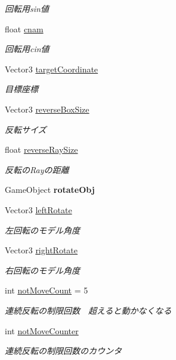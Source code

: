 \begin{DoxyCompactItemize}
\begin{DoxyCompactList}\small\item\em 回転用sin値 \end{DoxyCompactList}\item 
float \hyperlink{class_bone_a2b66e86799188e2d7f0e17aafe966df3}{cnam}
\begin{DoxyCompactList}\small\item\em 回転用cin値 \end{DoxyCompactList}\item 
Vector3 \hyperlink{class_bone_a2fcc3eb5e79c0b3abcffb50e9a60cb33}{target\+Coordinate}
\begin{DoxyCompactList}\small\item\em 目標座標 \end{DoxyCompactList}\item 
Vector3 \hyperlink{class_bone_a7a244045aac150bb4e59bdfe7304c333}{reverse\+Box\+Size}
\begin{DoxyCompactList}\small\item\em 反転サイズ \end{DoxyCompactList}\item 
float \hyperlink{class_bone_a28cb81944e3d4102e78038df1fda96c4}{reverse\+Ray\+Size}
\begin{DoxyCompactList}\small\item\em 反転の\+Rayの距離 \end{DoxyCompactList}\item 
\mbox{\label{class_bone_a8f40ec6b18b86e98c8aa28b661c10b40}} 
Game\+Object {\bfseries rotate\+Obj}
\item 
Vector3 \hyperlink{class_bone_a13ede7fb2b1628b62fb24c247cb2f80c}{left\+Rotate}
\begin{DoxyCompactList}\small\item\em 左回転のモデル角度 \end{DoxyCompactList}\item 
Vector3 \hyperlink{class_bone_ab2ba8ba25c37da3bf2c7a9a3046f137b}{right\+Rotate}
\begin{DoxyCompactList}\small\item\em 右回転のモデル角度 \end{DoxyCompactList}\item 
int \hyperlink{class_bone_ab73dc87056447cb775d87e83c0664395}{not\+Move\+Count} = 5
\begin{DoxyCompactList}\small\item\em 連続反転の制限回数　超えると動かなくなる \end{DoxyCompactList}\item 
int \hyperlink{class_bone_ac58bbae121031a91ff61a81007c6c96d}{not\+Move\+Counter}
\begin{DoxyCompactList}\small\item\em 連続反転の制限回数のカウンタ \end{DoxyCompactList}\end{DoxyCompactItemize}
